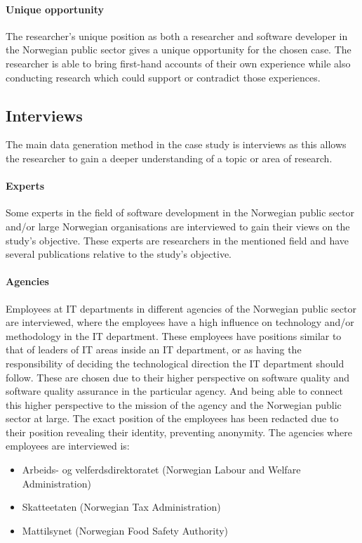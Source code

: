 \paragraph{Unique opportunity}
The researcher's unique position as both a researcher and software developer in the Norwegian public sector gives a unique opportunity for the chosen case. The researcher is able to bring first-hand accounts of their own experience while also conducting research which could support or contradict those experiences.

\subsection{Interviews}
The main data generation method in the case study is interviews as this allows the researcher to gain a deeper understanding of a topic or area of research.

\paragraph{Experts}
Some experts in the field of software development in the Norwegian public sector and/or large Norwegian organisations are interviewed to gain their views on the study's objective. These experts are researchers in the mentioned field and have several publications relative to the study's objective.

\paragraph{Agencies}
Employees at IT departments in different agencies of the Norwegian public sector are interviewed, where the employees have a high influence on technology and/or methodology in the IT department. These employees have positions similar to that of leaders of IT areas inside an IT department, or as having the responsibility of deciding the technological direction the IT department should follow. These are chosen due to their higher perspective on software quality and software quality assurance in the particular agency. And being able to connect this higher perspective to the mission of the agency and the Norwegian public sector at large. The exact position of the employees has been redacted due to their position revealing their identity, preventing anonymity. The agencies where employees are interviewed is:

\begin{itemize}
    \item Arbeids- og velferdsdirektoratet (Norwegian Labour and Welfare Administration)
    \item Skatteetaten (Norwegian Tax Administration)
    \item Mattilsynet (Norwegian Food Safety Authority)
\end{itemize}


